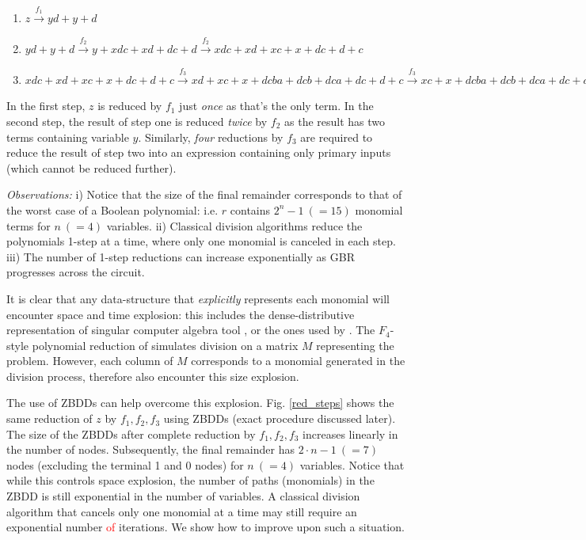 \begin{enumerate}
\item { $z \xrightarrow{f_1} y d +y +d$}
\item { $y d +y +d \xrightarrow{f_2} y + xdc + xd + dc + d \xrightarrow{f_2} xdc + xd + xc + x +dc + d + c$}
\item { $xdc + xd + xc + x +dc + d + c \xrightarrow{f_3} xd + xc + x  +
  dcba  + dcb + dca + dc + d + c \xrightarrow{f_3} xc + x + dcba +dcb
  + dca + dc + dba + db + da + d + c \xrightarrow{f_3} x  +dcba +dcb +
  dca + dc + dba + db + da + d + cba + cb + ca + c \xrightarrow{f_3}
  dcba +dcb + dca + dc + dba + db + da + d + cba + cb + ca + c + ba +
  b +a=r$}
\end{enumerate}


In the first step, $z$ is reduced by $f_1$ just {\it once} as that's the only term. In the
second step, the result of step one is reduced {\it twice} by $f_2$ as
the result has two terms containing variable $y$. Similarly,
{\it four} reductions by $f_3$ are required to 
reduce the result of step two into an expression containing only
primary inputs (which cannot be reduced further). 

{\it Observations:} i) Notice that the size of the final remainder 
corresponds to that of the worst case of a Boolean polynomial:
i.e. $r$ contains $2^n - 1\ (=15)$ monomial terms for $n\ (=4)$ variables. ii)
Classical division algorithms reduce the polynomials 1-step at a time,
where only one monomial is canceled in each step. iii) The number of
1-step reductions can increase exponentially as GBR progresses across
the circuit. 

It is clear that any data-structure that {\it explicitly} represents
each monomial will encounter space and time explosion: this includes
the dense-distributive representation of {\sc singular} computer
algebra tool \cite{DGPS}, or the ones used by
\cite{ciesielski:dac2015,rolf:date16}. The $F_4$-style
polynomial reduction of \cite{lv:tcad2013,pruss:tcad} simulates
division on a matrix $M$ representing the problem. However, each column
of $M$ corresponds to a monomial generated in the division process,
therefore \cite{lv:tcad2013,pruss:tcad} also encounter this size
explosion. 

The use of ZBDDs can help overcome this explosion. Fig. \ref{red_steps} shows
the same reduction of $z$ by $f_1,f_2,f_3$ using ZBDDs (exact
procedure discussed later). The size of the ZBDDs after complete reduction by
$f_1,f_2,f_3$ increases linearly in the number of nodes. Subsequently,
the final remainder has $2\cdot n - 1\ (=7)$ nodes (excluding the
terminal 1 and 0 nodes) for $n\ (=4)$ variables. Notice that while
this controls space explosion, the number of paths (monomials) in the
ZBDD is still exponential in the number of variables. A classical
division algorithm that cancels only one monomial at a time may still
require an exponential number \textcolor{red}{of} iterations. We show how to improve upon
such a situation. 

